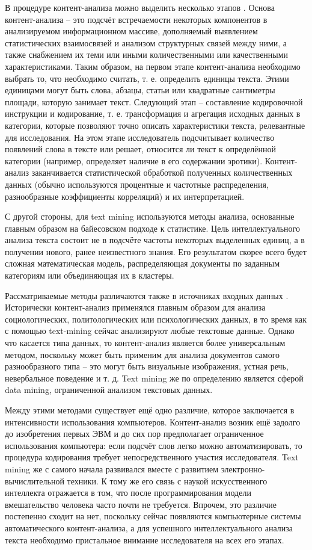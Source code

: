 В процедуре контент-анализа можно выделить несколько этапов \cite[стр. 12-13]{Morozova2007}. Основа контент-анализа – это подсчёт встречаемости некоторых компонентов в анализируемом информационном массиве, дополняемый выявлением статистических взаимосвязей и анализом структурных связей между ними, а также снабжением их теми или иными количественными или качественными характеристиками. Таким образом, на первом этапе контент-анализа необходимо выбрать то, что необходимо считать, т. е. определить единицы текста. Этими единицами могут быть слова, абзацы, статьи или квадратные сантиметры площади, которую занимает текст. Следующий этап -- составление кодировочной инструкции и кодирование, т. е. трансформация и агрегация исходных данных в категории, которые позволяют точно описать характеристики текста, релевантные для исследования. На этом этапе исследователь подсчитывает количество появлений слова в тексте или решает, относится ли текст к определённой категории (например, определяет наличие в его содержании эротики). Контент-анализ заканчивается статистической обработкой полученных количественных данных (обычно используются процентные и частотные распределения, разнообразные коэффициенты корреляций) и их интерпретацией.

С другой стороны, для text mining используются методы анализа, основанные главным образом на байесовском подходе к статистике. Цель интеллектуального анализа текста состоит не в подсчёте частоты некоторых выделенных единиц, а в получении нового, ранее неизвестного знания. Его результатом скорее всего будет сложная математическая модель, распределяющая документы по заданным категориям или объединяющая их в кластеры.

Рассматриваемые методы различаются также в источниках входных данных \cite[стр. 735]{tm_and_ca}. Исторически контент-анализ применялся главным образом для анализа социологических, политологических или психологических данных, в то время как с помощью text-mining сейчас анализируют любые текстовые данные. Однако что касается типа данных, то контент-анализ является более универсальным методом, поскольку может быть применим для анализа документов самого разнообразного типа -- это могут быть визуальные изображения, устная речь, невербальное поведение и т. д. Text mining же по определению является сферой data mining, ограниченной анализом текстовых данных.

Между этими методами существует ещё одно различие, которое заключается в интенсивности использования компьютеров. Контент-анализ возник ещё задолго до изобретения первых ЭВМ и до сих пор предполагает ограниченное использования компьютера: если подсчёт слов легко можно автоматизировать, то процедура кодирования требует непосредственного участия исследователя. Text mining же с самого начала развивался вместе с развитием электронно-вычислительной техники. К тому же его связь с наукой искусственного интеллекта отражается в том, что после программирования модели вмешательство человека часто почти не требуется. Впрочем, это различие постепенно сходит на нет, поскольку сейчас появляются компьютерные системы автоматического контент-анализа, а для успешного интеллектуального анализа текста необходимо пристальное внимание исследователя на всех его этапах.

